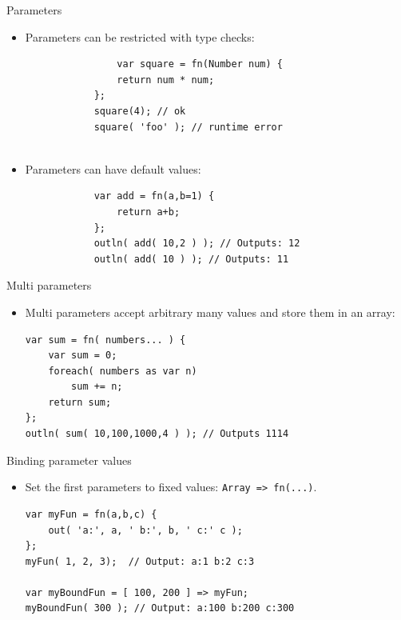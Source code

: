 \documentclass[ucs,9pt]{beamer}
\begin{document}
\begin{frame}[fragile]{Parameters}
	\begin{itemize}
	\item Parameters can be restricted with type checks:
		\begin{lstlisting}
				var square = fn(Number num) {
			    return num * num;
			};
			square(4); // ok
			square( 'foo' ); // runtime error
			
		\end{lstlisting}
	\pause
	\item Parameters can have default values:
		\begin{lstlisting}
			var add = fn(a,b=1) {
			    return a+b;
			};
			outln( add( 10,2 ) ); // Outputs: 12
			outln( add( 10 ) ); // Outputs: 11
		\end{lstlisting}
		\end{itemize}
	\end{frame}

\begin{frame}[fragile]{Multi parameters}
	\begin{itemize}
	\item Multi parameters accept arbitrary many values and store them in an array:
		\begin{lstlisting}
var sum = fn( numbers... ) {
    var sum = 0;
    foreach( numbers as var n)
        sum += n;
    return sum;
};
outln( sum( 10,100,1000,4 ) ); // Outputs 1114
		\end{lstlisting}
		\end{itemize}
	\end{frame}


\begin{frame}[fragile]{Binding parameter values}
	\begin{itemize}
	\item Set the first parameters to fixed values: \lstinline!Array => fn(...)!.
		\begin{lstlisting}
var myFun = fn(a,b,c) {
    out( 'a:', a, ' b:', b, ' c:' c );
};
myFun( 1, 2, 3);  // Output: a:1 b:2 c:3

var myBoundFun = [ 100, 200 ] => myFun;
myBoundFun( 300 ); // Output: a:100 b:200 c:300
		\end{lstlisting}
		\end{itemize}
	\end{frame}
\end{document}

